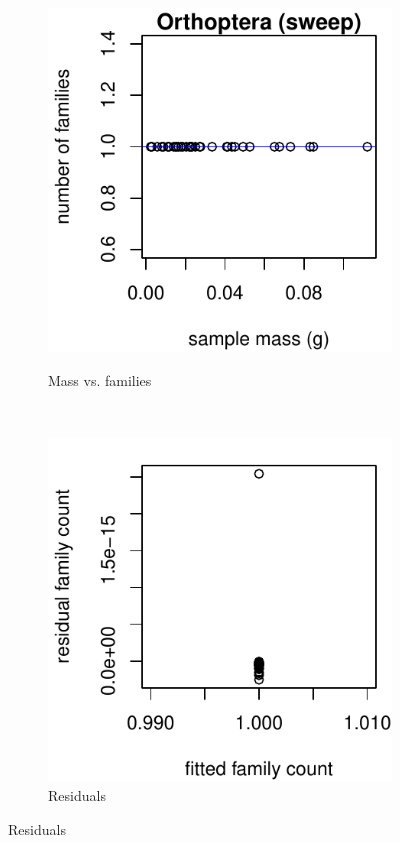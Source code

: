 \documentclass[10pt,letterpaper,twocolumn]{article}
\begin{document}
\begin{figure}[h]
	\centering
	\begin{subfigure}[b]{0.15\textwidth}
		\caption{Mass vs. families}
		\includegraphics[width=\textwidth]{plots/mass-vs-count/scatter/2015_sweep_Orthoptera_mass-vs-count.pdf}
		\label{fig:sweep_orthoptera_scatter}
	\end{subfigure}
	~
	\begin{subfigure}[b]{0.15\textwidth}
		\caption{Residuals}
		\includegraphics[width=\textwidth]{plots/mass-vs-count/residual/2015_sweep_Orthoptera_residual.pdf}

\end{subfigure}
\end{figure}
\end{document}
